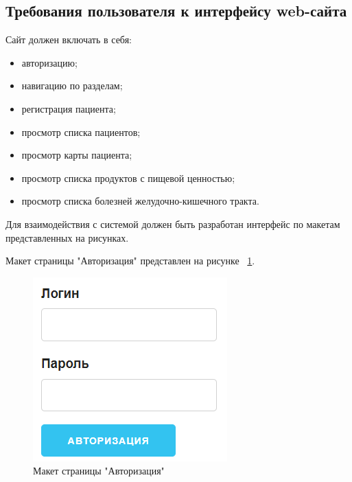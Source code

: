 \subsection{Требования пользователя к интерфейсу web-сайта}

Сайт должен включать в себя:
\begin{itemize}
    \item авторизацию;
    \item навигацию по разделам;
    \item регистрация пациента;
    \item просмотр списка пациентов;
    \item просмотр карты пациента;
    \item просмотр списка продуктов с пищевой ценностью;
    \item просмотр списка болезней желудочно-кишечного тракта.
\end{itemize}

Для взаимодействия с системой должен быть разработан интерфейс по макетам представленных на рисунках.

Макет страницы "Авторизация" представлен на рисунке ~\ref{fig:image}.
\begin{figure}[th]
	\centering
	\includegraphics[width=1\linewidth]{images/Авторизация}
	\caption{Макет страницы "Авторизация"}
	\label{fig:image}
\end{figure}

